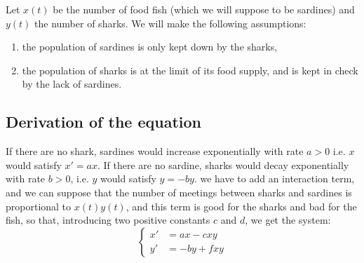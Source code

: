 Let $x(t)$ be the number of food fish (which we will suppose to be sardines) and $y(t)$ the number of sharks. We will make the following assumptions:
\begin{enumerate}
\item the population of sardines is only kept down by the sharks,
\item the population of sharks is at the limit of its food supply, and is kept in check by the lack of sardines.
\end{enumerate}

\subsection{Derivation of the equation}

If there are no shark, sardines would increase exponentially with rate $a>0$ i.e. $x$ would satisfy $x' = ax$. If there are no sardine, sharks would decay exponentially with rate $b>0$, i.e. $y$ would satisfy $y = -by$. we have to add an interaction term, and we can suppose that the number of meetings between sharks and sardines is proportional to $x(t)y(t)$, and this term is good for the sharks and bad for the fish, so that, introducing two positive constants $c$ and $d$, we get the system:
\[\left\{\begin{split}
x' & =  ax -cxy\\
y' & =  -by +fxy 
\end{split}\right.\]  

